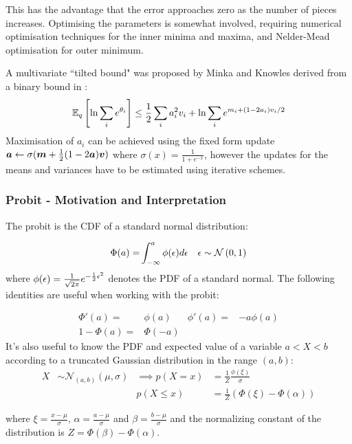 This has the advantage that the error approaches zero as the number of pieces increases. Optimising the parameters is somewhat involved, requiring numerical optimisation techniques for the inner minima and maxima, and Nelder-Mead optimisation for outer minimum.

A multivariate ``tilted bound" was proposed by Minka and Knowles\cite{MinkaKnowles} derived from a binary bound in \cite{SaulJordan1998}:
\begin{equation}
\ex{\ln \sum_i e^{\theta_i}}{q} \leq \half \sum_i a_i^2 v_i + \ln \sum_i e^{m_i + (1-2a_i)v_i/2}
\end{equation}
Maximisation of $a_i$ can be achieved using the fixed form update $\vv{a} \leftarrow \sigma(\vv{m} + \half(1 - 2 \vv{a})\vv{v})$ where $\sigma(x) = \frac{1}{1 + e^{-x}}$, however the updates for the means and variances have to be estimated using iterative schemes. 

\subsubsection{Probit - Motivation and Interpretation}
The probit is the CDF of a standard normal distribution:

\begin{align}
\Phi(a) = & \int_{-\infty}^{a} \phi(\epsilon) d\epsilon & \epsilon \sim \nor{0}{1}
\end{align}
where $\phi(\epsilon) = \frac{1}{\sqrt{2\pi}} e^{-\half \epsilon ^2}$ denotes the PDF of a standard normal. The following identities are useful when working with the probit:

\begin{align}
    \Phi'(a) = & \phi(a)  & \phi'(a) = & -a \phi(a) \\
    1 - \Phi(a) = & \Phi(-a) & \text{ } & \text{ }
  \label{eqn:probit-identities}
\end{align}
It's also useful to know the PDF and expected value of a variable $a < X < b$ according to a truncated Gaussian distribution in the range $(a,b)$:
\begin{align}
X & \sim \mathcal{N}_{(a,b)}\left(\mu, \sigma \right) & \implies p(X = x) & = \frac{1}{Z} \frac{\phi (\xi)}{\sigma} \\
 & & p(X \leq x) & = \frac{1}{Z} \left( \Phi(\xi) - \Phi(\alpha)\right)
\end{align}

where $\xi = \frac{x - \mu}{\sigma}$, $\alpha = \frac{a - \mu}{\sigma}$ and $\beta = \frac{b - \mu}{\sigma}$ and the normalizing constant of the distribution is $Z = \Phi(\beta) - \Phi(\alpha)$. 

